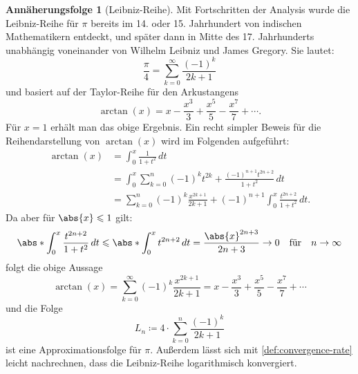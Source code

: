\documentclass{scrartcl}
\theoremstyle{definition}
\newtheorem{approximation sequence}{Annäherungsfolge}
\begin{document}
\begin{approximation sequence}[Leibniz-Reihe]
Mit Fortschritten der Analysis wurde die Leibniz-Reihe für \(\pi\) bereits im
14. oder 15. Jahrhundert von indischen Mathematikern entdeckt, und später dann
in Mitte des 17. Jahrhunderts unabhängig voneinander von Wilhelm Leibniz und
James Gregory. Sie lautet:
\begin{equation*}
    \frac{\pi}{4} = \sum_{k=0}^{\infty} \frac{{(-1)}^k}{2k+1}
\end{equation*}
und basiert auf der Taylor-Reihe für den Arkustangens
\begin{equation*}
    \arctan(x) = x - \frac{x^3}{3} + \frac{x^5}{5} - \frac{x^7}{7} + \cdots.
\end{equation*}
Für \(x = 1\) erhält man das obige Ergebnis. Ein recht simpler Beweis für die
Reihendarstellung von \(\arctan(x)\) wird im Folgenden aufgeführt: \cite{Leibniz}
\begin{align*}
    \arctan(x) & = \int_0^x \frac{1}{1+t^2} \, dt                                                                    \\
               & = \int_0^x \sum_{k=0}^n {(-1)}^k t^{2k} + \frac{{(-1)}^{n+1}t^{2n+2}}{1+t^2} \, dt                  \\
               & = \sum_{k=0}^n {(-1)}^k \frac{x^{2k+1}}{2k+1} + {(-1)}^{n+1} \int_0^x \frac{t^{2n+2}}{1+t^2} \, dt.
\end{align*}
Da aber für \(\abs{x} \leqslant 1\) gilt:
\begin{equation*}
    \abs*{\int_0^x \frac{t^{2n+2}}{1+t^2} \, dt} \leqslant \abs*{\int_0^x t^{2n+2} \, dt}
    = \frac{\abs{x}^{2n+3}}{2n+3} \to 0 \quad \text{für} \quad n \to \infty
\end{equation*}
folgt die obige Aussage
\begin{equation*}
    \arctan(x) = \sum_{k=0}^\infty {(-1)}^k \frac{x^{2k+1}}{2k+1}
    = x - \frac{x^3}{3} + \frac{x^5}{5} - \frac{x^7}{7} + \cdots
\end{equation*}
und die Folge
\begin{equation*}
    L_n \coloneq 4 \cdot \sum_{k=0}^{n} \frac{(-1)^k}{2k+1}
\end{equation*}
ist eine Approximationsfolge für \(\pi\). Außerdem lässt sich mit
\autoref{def:convergence-rate} leicht nachrechnen, dass die Leibniz-Reihe
logarithmisch konvergiert.
\end{approximation sequence}
\end{document}
